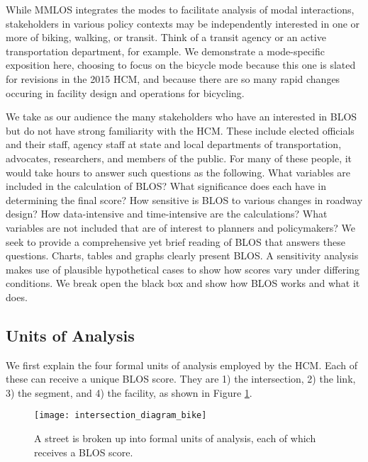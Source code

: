 \documentclass[11pt]{article} %
\begin{document}
While MMLOS integrates the modes to facilitate analysis of modal interactions, stakeholders in various policy contexts may be independently interested in one or more of biking, walking, or transit. Think of a transit agency or an active transportation department, for example. We demonstrate a mode-specific exposition here, choosing to focus on the bicycle mode because this one is slated for revisions in the 2015 HCM, and because there are so many rapid changes occuring in facility design and operations for bicycling.

We take as our audience the many stakeholders who have an interested in BLOS but do not have strong familiarity with the HCM. These include elected officials and their staff, agency staff at state and local departments of transportation, advocates, researchers, and members of the public. For many of these people, it would take hours to answer such questions as the following. What variables are included in the calculation of BLOS? What significance does each have in determining the final score? How sensitive is BLOS to various changes in roadway design? How data-intensive and time-intensive are the calculations? What variables are not included that are of interest to planners and policymakers? We seek to provide a comprehensive yet brief reading of BLOS that answers these questions. Charts, tables and graphs clearly present BLOS. A sensitivity analysis makes use of plausible hypothetical cases to show how scores vary under differing conditions. We break open the black box and show how BLOS works and what it does.


\subsection{Units of Analysis}

We first explain the four formal units of analysis employed by the HCM. Each of these can receive a unique BLOS score. They are 1) the intersection, 2) the link, 3) the segment, and 4) the facility, as shown in Figure \ref{fig:unitsOfAnalysis}. 


\begin{figure}

\texttt{[image: intersection\_diagram\_bike]}

\caption{A street is broken up into formal units of analysis, each of which receives a BLOS score.}

\label{fig:unitsOfAnalysis}

\end{figure}
\end{document}
